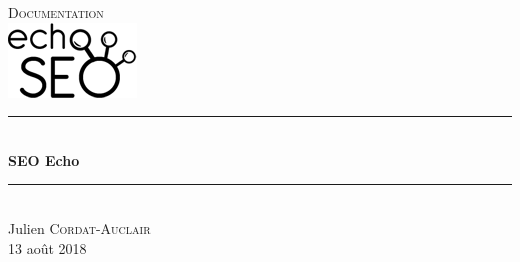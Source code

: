 \documentclass[12pt]{article}
\begin{document}
\begin{titlepage}

\newcommand{\HRule}{\rule{\linewidth}{0.2mm}} %

\center %
 

\textsc{\LARGE Documentation}\\[3.0cm] %


\includegraphics[scale=1]{logoSEO.png}\\[3.0cm] %


\HRule \\[0.5cm]
{ \huge \bfseries SEO Echo}\\[0.2cm] %
\HRule \\[1.5cm]


\centering \large
Julien \textsc{Cordat-Auclair}\\[1cm] %


{\large 13 août 2018}\\[3cm] %



\end{titlepage}
\end{document}
